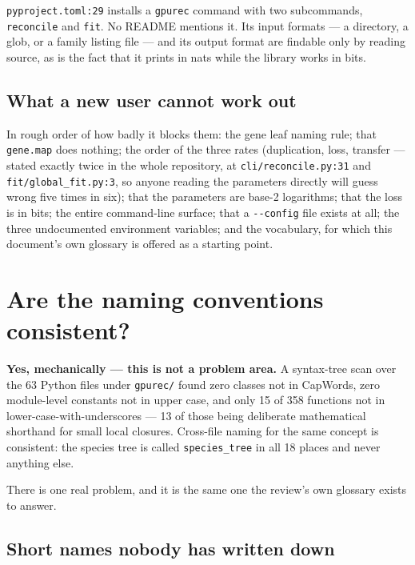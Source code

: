 \documentclass[11pt]{article}
\newcommand{\loc}[1]{\nolinkurl{#1}}
\newcommand{\dir}[1]{\nolinkurl{#1}}
\begin{document}
\loc{pyproject.toml:29} installs a \texttt{gpurec} command with two
subcommands, \texttt{reconcile} and \texttt{fit}.  No README mentions it.  Its
input formats --- a directory, a glob, or a family listing file --- and its
output format are findable only by reading source, as is the fact that it prints
in nats while the library works in bits.

\subsection{What a new user cannot work out}

In rough order of how badly it blocks them: the gene leaf naming rule; that
\dir{gene.map} does nothing; the order of the three rates (duplication, loss,
transfer --- stated exactly twice in the whole repository, at
\loc{cli/reconcile.py:31} and \loc{fit/global\_fit.py:3}, so anyone reading the
parameters directly will guess wrong five times in six); that the parameters are
base-2 logarithms; that the loss is in bits; the entire command-line surface;
that a \texttt{-{}-config} file exists at all; the three undocumented
environment variables; and the vocabulary, for which this document's own
glossary is offered as a starting point.

\section{Are the naming conventions consistent?}

\textbf{Yes, mechanically --- this is not a problem area.}  A syntax-tree scan
over the 63 Python files under \dir{gpurec/} found zero classes not in CapWords,
zero module-level constants not in upper case, and only 15 of 358 functions not
in lower-case-with-underscores --- 13 of those being deliberate mathematical
shorthand for small local closures.  Cross-file naming for the same concept is
consistent: the species tree is called \texttt{species\_tree} in all 18 places
and never anything else.

There is one real problem, and it is the same one the review's own glossary
exists to answer.

\subsection{Short names nobody has written down}
\end{document}
